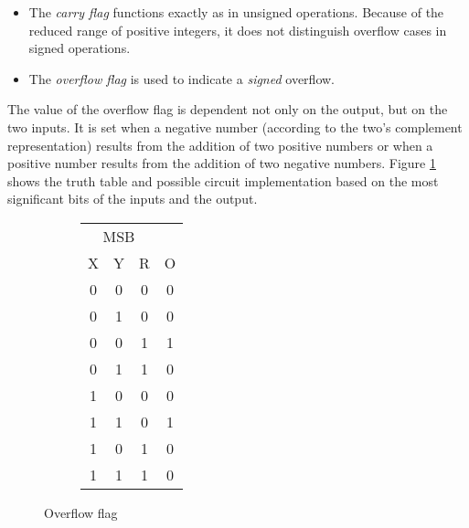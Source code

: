 \begin{itemize}
    \item
        The \textit{carry flag} functions exactly as in unsigned operations.
        Because of the reduced range of positive integers, it does not
        distinguish overflow cases in signed operations.
    \item
        The \textit{overflow flag} is used to indicate a \emph{signed} overflow.
\end{itemize}

The value of the overflow flag is dependent not only on the output, but on the
two inputs.  It is set when a negative number (according to the two's complement
representation) results from the addition of two positive numbers or when a
positive number results from the addition of two negative numbers.  Figure
\ref{fig:arch:overflow_flag} shows the truth table and possible circuit
implementation based on the most significant bits of the inputs and the
output\footnotemark.


\begin{figure}[ht]
    \centering
    \hfill
    \begin{subfigure}[h]{0.3\textwidth}
        \begin{tabular}{ccc|c}
            \multicolumn{3}{c}{MSB} & \\
            X & Y & R & O \\
            \hline
            0 & 0 & 0 & 0 \\
            0 & 1 & 0 & 0 \\
            0 & 0 & 1 & 1 \\
            0 & 1 & 1 & 0 \\
            1 & 0 & 0 & 0 \\
            1 & 1 & 0 & 1 \\
            1 & 0 & 1 & 0 \\
            1 & 1 & 1 & 0 \\
        \end{tabular}
    \end{subfigure}
    \begin{subfigure}[h]{0.5\textwidth}
        
    \end{subfigure}
    \hfill
    \caption{Overflow flag}
    \label{fig:arch:overflow_flag}
\end{figure}
